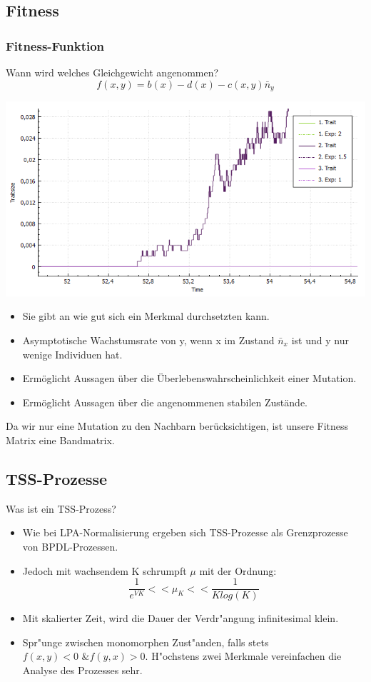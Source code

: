 \documentclass{beamer}
\begin{document}
\subsection{Fitness}
\begin{frame}
	\frametitle{Fitness-Funktion}
	\begin{minipage}{0.49\textwidth}
	Wann wird welches Gleichgewicht angenommen?\pause
	\[ f(x,y) = b(x) - d(x) - c(x,y)\bar{n}_y \]\pause
	\end{minipage}
	\begin{minipage}{0.49\textwidth}
	\includegraphics[width=1\linewidth]{./Pictures/Mutation_posFitness}
	\end{minipage}	
	\begin{itemize}
		\item Sie gibt an wie gut sich ein Merkmal durchsetzten kann.\pause
		\item Asymptotische Wachstumsrate von y, wenn x im Zustand $ \bar{n}_x $ ist und y nur wenige Individuen hat.\pause
		\item Ermöglicht Aussagen über die Überlebenswahrscheinlichkeit einer Mutation.\pause
		\item Ermöglicht Aussagen über die angenommenen stabilen Zustände.\pause
	\end{itemize}
	Da wir nur eine Mutation zu den Nachbarn berücksichtigen, ist unsere Fitness Matrix eine Bandmatrix.
\end{frame}

\subsection{TSS-Prozesse}
\begin{frame}{Was ist ein TSS-Prozess?}
	\begin{itemize}
		\item Wie bei LPA-Normalisierung ergeben sich TSS-Prozesse als Grenzprozesse von BPDL-Prozessen.
		\pause
		\item Jedoch mit wachsendem K schrumpft $ \mu $ mit der Ordnung:
		\[ \frac{1}{e^{VK}} << \mu_K << \frac{1}{K log(K)} \]
		\pause
		\item Mit skalierter Zeit, wird die Dauer der Verdr"angung infinitesimal klein.
		\pause
		\item Spr"unge zwischen monomorphen Zust"anden, falls stets $ f(x,y) < 0 \text{ \& } f(y,x) > 0 $. H"ochstens zwei Merkmale vereinfachen die Analyse des Prozesses sehr.
	\end{itemize}
\end{frame}
\end{document}
